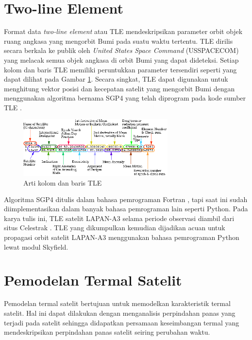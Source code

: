 \section{Two-line Element}

Format data \textit{two-line element} atau TLE mendeskripsikan parameter orbit
objek ruang angkasa yang mengorbit Bumi pada suatu waktu tertentu. TLE dirilis
secara berkala ke publik oleh \textit{United States Space Command} (USSPACECOM)
yang melacak semua objek angkasa di orbit Bumi yang dapat dideteksi. Setiap
kolom dan baris TLE memiliki peruntukkan parameter tersendiri seperti yang
dapat dilihat pada Gambar \ref{fig:tlemeaning}. Secara singkat, TLE dapat
digunakan untuk menghitung vektor posisi dan kecepatan satelit yang mengorbit
Bumi dengan menggunakan algoritma bernama SGP4 yang telah diprogram pada kode
sumber TLE \cite{vallado2008}.

\begin{figure}[H]
\setlength{}
\begin{center}
\includegraphics[width=0.7\textwidth]{fig/tlemeaning.png}
	\caption[Arti kolom dan baris TLE]{Arti kolom dan baris TLE~\cite{2011}}
\label{fig:tlemeaning}
\end{center}
\end{figure}

Algoritma SGP4 ditulis dalam bahasa pemrograman Fortran \cite{vallado2006},
tapi saat ini sudah diimplementasikan dalam banyak bahasa pemrograman lain
seperti Python. Pada karya tulis ini, TLE satelit LAPAN-A3 selama periode
observasi diambil dari situs Celestrak \cite{kelso}. TLE yang dikumpulkan
kemudian dijadikan acuan untuk propagasi orbit satelit LAPAN-A3 menggunakan
bahasa pemrograman Python lewat modul Skyfield.

\section{Pemodelan Termal Satelit}

Pemodelan termal satelit bertujuan untuk memodelkan karakteristik termal
satelit. Hal ini dapat dilakukan dengan menganalisis perpindahan panas yang
terjadi pada satelit sehingga didapatkan persamaan keseimbangan termal yang
mendeskripsikan perpindahan panas satelit seiring perubahan waktu.

